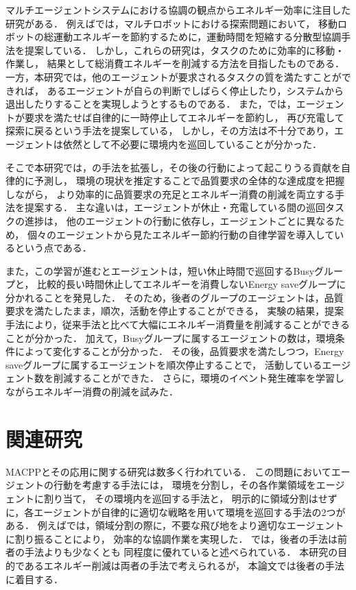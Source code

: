 \documentclass[12pt,a4j,twoside]{jarticle}
\begin{document}
マルチエージェントシステムにおける協調の観点からエネルギー効率に注目した研究\cite{Kim2016,Benkrid2019,Notomista2022}がある．
例えば\cite{Benkrid2019}では，マルチロボットにおける探索問題において，
移動ロボットの総運動エネルギーを節約するために，運動時間を短縮する分散型協調手法を提案している．
しかし，これらの研究は，タスクのために効率的に移動・作業し，
結果として総消費エネルギーを削減する方法を目指したものである．
一方，本研究では，他のエージェントが要求されるタスクの質を満たすことができれば，
あるエージェントが自らの判断でしばらく停止したり，システムから退出したりすることを実現しようとするものである．
また，\cite{WuPrima2019, Wu2019}では，エージェントが要求を満たせば自律的に一時停止してエネルギーを節約し，
再び充電して探索に戻るという手法を提案している，
しかし，その方法は不十分であり，エージェントは依然として不必要に環境内を巡回していることが分かった．
\par

そこで本研究では，\cite{Wu2019}の手法を拡張し，その後の行動によって起こりうる貢献を自律的に予測し，
環境の現状を推定することで品質要求の全体的な達成度を把握しながら，
より効率的に品質要求の充足とエネルギー消費の削減を両立する手法を提案する．
主な違いは，エージェントが休止・充電している間の巡回タスクの進捗は，
他のエージェントの行動に依存し，エージェントごとに異なるため，
個々のエージェントから見たエネルギー節約行動の自律学習を導入しているという点である．
\par

また，この学習が進むとエージェントは，短い休止時間で巡回するBusyグループと，
比較的長い時間休止してエネルギーを消費しないEnergy saveグループに分かれることを発見した．
そのため，後者のグループのエージェントは，品質要求を満たしたまま，順次，活動を停止することができる，
実験の結果，提案手法により，従来手法と比べて大幅にエネルギー消費量を削減することができることが分かった．
加えて，Busyグループに属するエージェントの数は，環境条件によって変化することが分かった．
その後，品質要求を満たしつつ，Energy saveグループに属するエージェントを順次停止することで，
活動しているエージェント数を削減することができた．
さらに，環境のイベント発生確率を学習しながらエネルギー消費の削減を試みた．
\par

\section{関連研究}
MACPPとその応用に関する研究は数多く行われている．
この問題においてエージェントの行動を考慮する手法には，
環境を分割し，その各作業領域をエージェントに割り当て，
その環境内を巡回する手法\cite{Hattori2021,Mazda2005,Agmon2011,Tevyashov2022,Wiandt2018}と，
明示的に領域分割はせずに，各エージェントが自律的に適切な戦略を用いて環境を巡回する手法の2つがある．
例えば\cite{Hattori2021}では，領域分割の際に，不要な飛び地をより適切なエージェントに割り振ることにより，
効率的な協調作業を実現した．
\cite{Chevaleyre2004}では，後者の手法は前者の手法よりも少なくとも
同程度に優れていると述べられている．
本研究の目的であるエネルギー削減は両者の手法で考えられるが，
本論文では後者の手法に着目する．
\par
\end{document}
